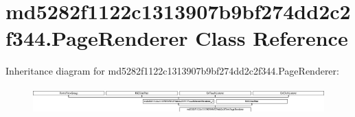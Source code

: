 \hypertarget{classmd5282f1122c1313907b9bf274dd2c2f344_1_1PageRenderer}{}\section{md5282f1122c1313907b9bf274dd2c2f344.\+Page\+Renderer Class Reference}
\label{classmd5282f1122c1313907b9bf274dd2c2f344_1_1PageRenderer}
Inheritance diagram for md5282f1122c1313907b9bf274dd2c2f344.\+Page\+Renderer\+:\begin{figure}[H]
\begin{center}
\leavevmode
\includegraphics[height=1.029412cm]{classmd5282f1122c1313907b9bf274dd2c2f344_1_1PageRenderer}
\end{center}
\end{figure}
